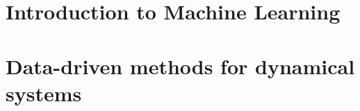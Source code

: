 \documentclass[11pt,fleqn]{book} %
\begin{document}
\part{Introduction to Machine Learning}


\part{Data-driven methods for dynamical systems}













\end{document}
